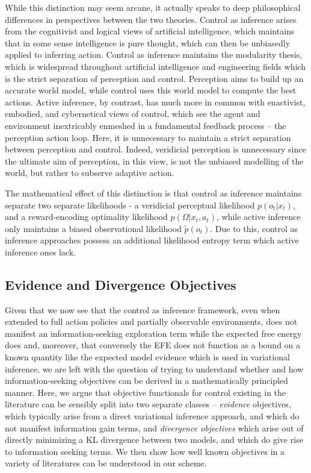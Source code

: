 While this distinction may seem arcane, it actually speaks to deep philosophical differences in perspectives between the two theories. Control as inference arises from the cognitivist and logical views of artificial intelligence, which maintains that in some sense intelligence is pure thought, which can then be unbiasedly applied to inferring action. Control as inference maintains the modularity thesis, which is widespread throughout artificial intelligence and engineering fields which is the strict separation of perception and control. Perception aims to build up an accurate world model, while control uses this world model to compute the best actions. Active inference, by contrast, has much more in common with enactivist, embodied, and cybernetical views of control, which see the agent and environment inextricably enmeshed in a fundamental feedback process -- the perception action loop. Here, it is unnecessary to maintain a strict separation between perception and control. Indeed, veridicial perception is unnecessary since the ultimate aim of perception, in this view, is not the unbiased modelling of the world, but rather to subserve adaptive action. 

The mathematical effect of this distinction is that control as inference maintains separate two separate likelihoods - a veridicial perceptual likelihood $p(o_t | x_t)$, and a reward-encoding optimality likelihood $p(\Omega | x_t, a_t)$, while active inference only maintains a biased observational likelihood $\tilde{p}(o_t)$. Due to this, control as inference approaches possess an additional likelihood entropy term which active inference ones lack. 

\subsection{Evidence and Divergence Objectives}

Given that we now see that the control as inference framework, even when extended to full action policies and partially observable environments, does not manifest an information-seeking exploration term while the expected free energy does and, moreover, that conversely the EFE does not function as a bound on a known quantity like the expected model evidence which is used in variational inference, we are left with the question of trying to understand whether and how information-seeking objectives can be derived in a mathematically principled manner. Here, we argue that objective functionals for control existing in the literature can be sensibly split into two separate classes -- \emph{evidence} objectives, which typically arise from a direct variational inference approach, and which do not manifest information gain terms, and \emph{divergence objectives} which arise out of directly minimizing a KL divergence between two models, and which do give rise to information seeking terms. We then show how well known objectives in a variety of literatures can be understood in our scheme. 

